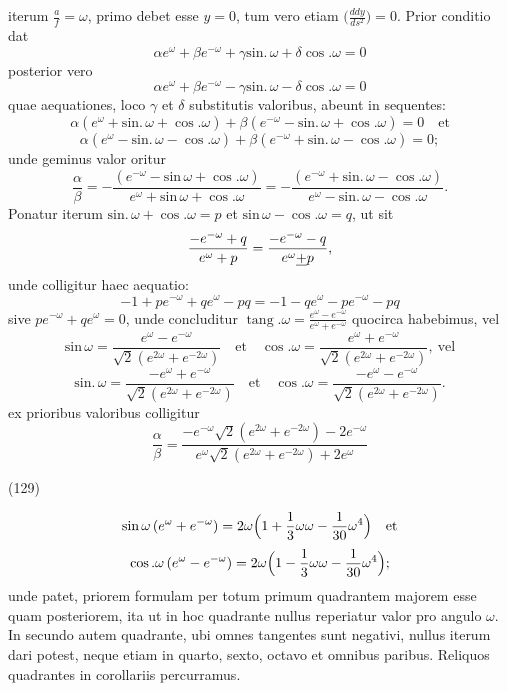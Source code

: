 \documentclass[11pt,a4paper]{article}
\begin{document}
iterum $\frac{a}{f} = \omega$, primo debet esse $y = 0$, tum vero etiam
$\bigl(\frac{ddy}{ds^2}\bigr) = 0$. Prior conditio dat
\[
\alpha e^\omega + \beta e^{-\omega} + \gamma\text{sin.}\,\omega + \delta\cos.\omega = 0
\]
posterior vero
\[
\alpha e^\omega + \beta e^{-\omega} - \gamma\text{sin.}\,\omega - \delta\cos.\omega = 0
\]
quae aequationes, loco $\gamma$ et $\delta$ substitutis valoribus, abeunt in sequentes:
\[
\alpha(e^\omega + \text{sin.}\,\omega + \cos.\omega) + \beta(e^{-\omega} - \text{sin.}\,\omega + \cos.\omega) = 0 \quad\text{et}
\]
\[
\alpha(e^\omega - \text{sin.}\,\omega - \cos.\omega) + \beta(e^{-\omega} + \text{sin.}\,\omega - \cos.\omega) = 0;
\]
unde geminus valor oritur
\[
\frac{\alpha}{\beta} = -\frac{(e^{-\omega} - \text{sin}\,\omega + \cos.\omega)}{e^\omega + \text{sin}\,\omega + \cos.\omega} = -\frac{(e^{-\omega} + \text{sin.}\,\omega - \cos.\omega)}{e^\omega - \text{sin.}\,\omega - \cos.\omega}.
\]
Ponatur iterum $\text{sin.}\,\omega + \cos.\omega = p$ et $\text{sin}\,\omega - \cos.\omega = q$, ut sit
\[
\frac{-e^{-\omega} + q}{e^\omega + p} = \frac{-e^{-\omega} - q}{e^\omega \uncertain{+} p},
\]
unde colligitur haec aequatio:
\[
-1 + pe^{-\omega} + qe^\omega - pq = -1 - qe^\omega - pe^{-\omega} - pq
\]
sive $pe^{-\omega} + qe^\omega = 0$, unde concluditur
$\operatorname{tang}.\omega = \frac{e^\omega - e^{-\omega}}{e^\omega + e^{-\omega}}$
quocirca habebimus, vel
\[
\text{sin}\,\omega = \frac{e^\omega - e^{-\omega}}{\sqrt{2}(e^{2\omega} + e^{-2\omega})} \quad\text{et}\quad \cos.\omega = \frac{e^\omega + e^{-\omega}}{\sqrt{2}(e^{2\omega} + e^{-2\omega})}, \ \text{vel}
\]
\[
\text{sin.}\,\omega = \frac{-e^\omega + e^{-\omega}}{\sqrt{2}(e^{2\omega} + e^{-2\omega})} \quad\text{et}\quad \cos.\omega = \frac{-e^\omega - e^{-\omega}}{\sqrt{2}(e^{2\omega} + e^{-2\omega})}.
\]
ex prioribus valoribus colligitur
\[
\frac{\alpha}{\beta} = \frac{-e^{-\omega}\sqrt{2}(e^{2\omega} + e^{-2\omega}) - 2e^{-\omega}}{e^\omega\sqrt{2}(e^{2\omega} + e^{-2\omega}) + 2e^\omega}
\]

(129)

\[
\text{sin}\,\omega\,(e^\omega + e^{-\omega}) = 2\omega\Bigl(1 + \frac{1}{3}\omega\omega - \frac{1}{30}\omega^4\Bigr) \quad\text{et}
\]
\[
\cos.\omega\,(e^\omega - e^{-\omega}) = 2\omega\Bigl(1 - \frac{1}{3}\omega\omega - \frac{1}{30}\omega^4\Bigr);
\]
unde patet, priorem formulam per totum primum quadrantem majorem esse quam
posteriorem, ita ut in hoc quadrante nullus reperiatur valor pro angulo $\omega$.
In secundo autem quadrante, ubi omnes tangentes sunt negativi, nullus iterum dari
potest, neque etiam in quarto, sexto, octavo et omnibus paribus. Reliquos quadrantes
in corollariis percurramus.
\end{document}
